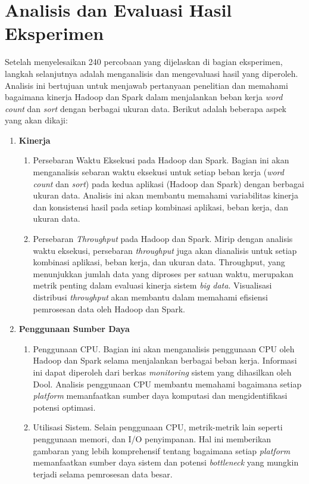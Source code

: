\section{Analisis dan Evaluasi Hasil Eksperimen}

Setelah menyelesaikan 240 percobaan yang dijelaskan di bagian eksperimen, langkah selanjutnya adalah menganalisis dan mengevaluasi hasil yang diperoleh. Analisis ini bertujuan untuk menjawab pertanyaan penelitian dan memahami bagaimana kinerja Hadoop dan Spark dalam menjalankan beban kerja \textit{word count} dan \textit{sort} dengan berbagai ukuran data. Berikut adalah beberapa aspek yang akan dikaji:

\begin{enumerate}	
	\item \textbf{Kinerja}
	\begin{enumerate}
		\item Persebaran Waktu Eksekusi pada Hadoop dan Spark. Bagian ini akan menganalisis sebaran waktu eksekusi untuk setiap beban kerja (\textit{word count} dan \textit{sort}) pada kedua aplikasi (Hadoop dan Spark) dengan berbagai ukuran data. Analisis ini akan membantu memahami variabilitas kinerja dan konsistensi hasil pada setiap kombinasi aplikasi, beban kerja, dan ukuran data.
		\item Persebaran \textit{Throughput} pada Hadoop dan Spark. Mirip dengan analisis waktu eksekusi, persebaran \textit{throughput} juga akan dianalisis untuk setiap kombinasi aplikasi, beban kerja, dan ukuran data. Throughput, yang menunjukkan jumlah data yang diproses per satuan waktu,  merupakan metrik penting dalam evaluasi kinerja sistem \textit{big data}.  Visualisasi distribusi \textit{throughput} akan membantu dalam memahami efisiensi pemrosesan data oleh Hadoop dan Spark.
	\end{enumerate}
	\newpage
	\item \textbf{Penggunaan Sumber Daya}
	\begin{enumerate}
	\item Penggunaan CPU. Bagian ini akan menganalisis penggunaan CPU oleh Hadoop dan Spark selama menjalankan berbagai beban kerja.  Informasi ini dapat diperoleh dari berkas \textit{monitoring} sistem yang dihasilkan oleh Dool.  Analisis penggunaan CPU membantu memahami bagaimana setiap \textit{platform} memanfaatkan sumber daya komputasi dan mengidentifikasi potensi optimasi.
	\item Utilisasi Sistem. Selain penggunaan CPU, metrik-metrik lain seperti penggunaan memori, dan I/O penyimpanan. Hal ini memberikan gambaran yang lebih komprehensif tentang bagaimana setiap \textit{platform} memanfaatkan sumber daya sistem dan potensi \textit{bottleneck} yang mungkin terjadi selama pemrosesan data besar.
	\end{enumerate}
\end{enumerate}











